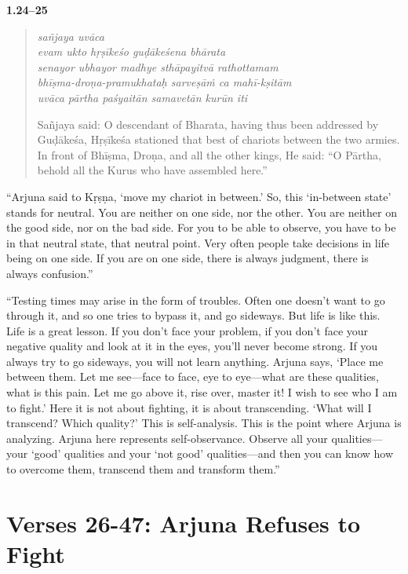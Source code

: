 \par\noindent\textbf{1.24–25}\par
\begin{verse}
\textit{sañjaya uvāca} \\
\textit{evam ukto hṛṣīkeśo guḍākeśena bhārata} \\
\textit{senayor ubhayor madhye sthāpayitvā rathottamam} \\
\textit{bhīṣma-droṇa-pramukhataḥ sarveṣāṁ ca mahī-kṣitām} \\
\textit{uvāca pārtha paśyaitān samavetān kurūn iti}

\noindent Sañjaya said: O descendant of Bharata, having thus been addressed by Guḍākeśa, Hṛṣīkeśa stationed that best of chariots between the two armies. In front of Bhīṣma, Droṇa, and all the other kings, He said: \enquote{O Pārtha, behold all the Kurus who have assembled here.}
\end{verse}
\par


\enquote{Arjuna said to Kṛṣṇa, \enquote{move my chariot in between.} So, this \enquote{in-between state} stands for neutral. You are neither on one side, nor the other. You are neither on the good side, nor on the bad side. For you to be able to observe, you have to be in that neutral state, that neutral point. Very often people take decisions in life being on one side. If you are on one side, there is always judgment, there is always confusion.}

\enquote{Testing times may arise in the form of troubles. Often one doesn’t want to go through it, and so one tries to bypass it, and go sideways. But life is like this. Life is a great lesson. If you don’t face your problem, if you don’t face your negative quality and look at it in the eyes, you’ll never become strong. If you always try to go sideways, you will not learn anything. Arjuna says, \enquote{Place me between them. Let me see---face to face, eye to eye---what are these qualities, what is this pain. Let me go above it, rise over, master it! I wish to see who I am to fight.} Here it is not about fighting, it is about transcending. \enquote{What will I transcend? Which quality?} This is self-analysis. This is the point where Arjuna is analyzing. Arjuna here represents self-observance. Observe all your qualities---your \enquote{good} qualities and your \enquote{not good} qualities---and then you can know how to overcome them, transcend them and transform them.}

\section{Verses 26-47: Arjuna Refuses to Fight}\label{sec-verses-26-47-arjuna-refuses-to-fight}

